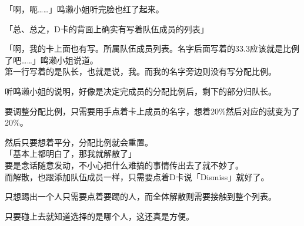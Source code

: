 「啊，呃……」鸣濑小姐听完脸也红了起来。

「总、总之，D卡的背面上确实有写着队伍成员的列表」

「啊，我的卡上面也有写。所属队伍成员列表。名字后面写着的33.3应该就是比例了吧……」鸣濑小姐说道。\\

第一行写着的是队长，也就是说，我。而我的名字旁边则没有写分配比例。

听鸣濑小姐的说明，好像是决定完成员的分配比例后，剩下的部分归队长。

要调整分配比例，只需要用手点着卡上成员的名字，想着20\%然后对应的就变为了20\%。

然后只要想着平分，分配比例就会重置。\\

「基本上都明白了，那我就解散了」\\

要是念话随意发动，不小心把什么难搞的事情传出去了就不妙了。\\

而解散，也跟添加队伍成员一样，只需要点着D卡说「Dismiss」就好了。

只想踢出一个人只需要点着要踢的人，而全体解散则需要接触到整个列表。

只要碰上去就知道选择的是哪个人，这还真是方便。\\

